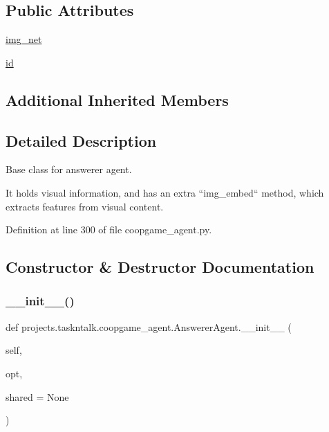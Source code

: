 \subsection*{Public Attributes}
\begin{DoxyCompactItemize}
\item 
\hyperlink{classprojects_1_1taskntalk_1_1coopgame__agent_1_1AnswererAgent_aaacafcdb5120fcb653f10312fb27177c}{img\+\_\+net}
\item 
\hyperlink{classprojects_1_1taskntalk_1_1coopgame__agent_1_1AnswererAgent_aed3237a6db100286caf99f18f2596def}{id}
\end{DoxyCompactItemize}
\subsection*{Additional Inherited Members}


\subsection{Detailed Description}
\begin{DoxyVerb}Base class for answerer agent.

It holds visual information, and has an extra  ``img_embed`` method, which extracts
features from visual content.
\end{DoxyVerb}
 

Definition at line 300 of file coopgame\+\_\+agent.\+py.



\subsection{Constructor \& Destructor Documentation}
\mbox{\label{classprojects_1_1taskntalk_1_1coopgame__agent_1_1AnswererAgent_a7781c189ee128bbbf7c59536411a5cd8}} 
\subsubsection{\texorpdfstring{\+\_\+\+\_\+init\+\_\+\+\_\+()}{\_\_init\_\_()}}
{\footnotesize\ttfamily def projects.\+taskntalk.\+coopgame\+\_\+agent.\+Answerer\+Agent.\+\_\+\+\_\+init\+\_\+\+\_\+ (\begin{DoxyParamCaption}\item[{}]{self,  }\item[{}]{opt,  }\item[{}]{shared = {\ttfamily None} }\end{DoxyParamCaption})}



